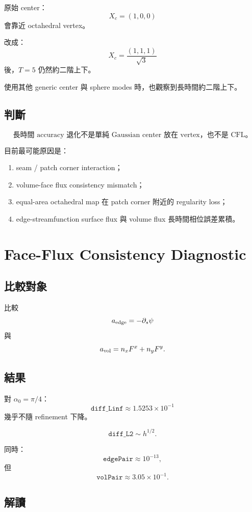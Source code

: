 \documentclass[UTF8,12pt,a4paper]{ctexart}
\begin{document}
原始 center：
\[
X_c=(1,0,0)
\]
會靠近 octahedral vertex。

改成：
\[
X_c=\frac{(1,1,1)}{\sqrt3}
\]
後，$T=5$ 仍然約二階上下。

使用其他 generic center 與 sphere modes 時，也觀察到長時間約二階上下。

\subsection{判斷}

\[
\boxed{
\text{長時間 accuracy 退化不是單純 Gaussian center 放在 vertex，也不是 CFL。}
}
\]

目前最可能原因是：
\begin{enumerate}
  \item seam / patch corner interaction；
  \item volume-face flux consistency mismatch；
  \item equal-area octahedral map 在 patch corner 附近的 regularity loss；
  \item edge-streamfunction surface flux 與 volume flux 長時間相位誤差累積。
\end{enumerate}

\section{Face-Flux Consistency Diagnostic}

\subsection{比較對象}

比較
\[
a_{\rm edge}
=
-\partial_s\psi
\]
與
\[
a_{\rm vol}
=
n_xF^x+n_yF^y.
\]

\subsection{結果}

對 $\alpha_0=\pi/4$：
\[
\texttt{diff\_Linf}\approx1.5253\times10^{-1}
\]
幾乎不隨 refinement 下降。

\[
\texttt{diff\_L2}
\sim h^{1/2}.
\]

同時：
\[
\texttt{edgePair}\approx10^{-13},
\]
但
\[
\texttt{volPair}\approx3.05\times10^{-1}.
\]

\subsection{解讀}
\end{document}
